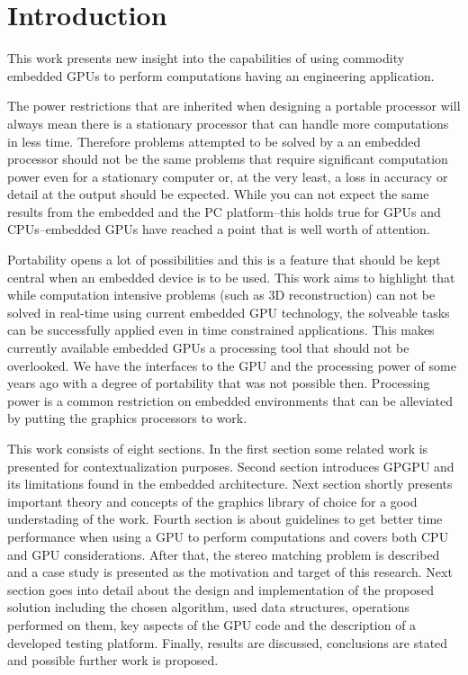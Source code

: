 \documentclass[conference]{IEEEtran}
\begin{document}
\section{Introduction}
This work presents new insight into the capabilities of using commodity embedded GPUs to perform computations having an engineering application.

The power restrictions that are inherited when designing a portable processor will always mean there is a stationary processor that can handle more computations in less time. Therefore problems attempted to be solved by a an embedded processor should not be the same problems that require significant computation power even for a stationary computer or, at the very least, a loss in accuracy or detail at the output should be expected. While you can not expect the same results from the embedded and the PC platform--this holds true for GPUs and CPUs--embedded GPUs have reached a point that is well worth of attention.

Portability opens a lot of possibilities and this is a feature that should be kept central when an embedded device is to be used. This work aims to highlight that while computation intensive problems (such as 3D reconstruction) can not be solved in real-time using current embedded GPU technology, the solveable tasks can be successfully applied even in time constrained applications. This makes currently available embedded GPUs a processing tool that should not be overlooked. We have the interfaces to the GPU and the processing power of some years ago with a degree of portability that was not possible then. Processing power is a common restriction on embedded environments that can be alleviated by putting the graphics processors to work.

This work consists of eight sections. In the first section some related work is presented for contextualization purposes. Second section introduces GPGPU and its limitations found in the embedded architecture. Next section shortly presents important theory and concepts of the graphics library of choice for a good understading of the work. Fourth section is about guidelines to get better time performance when using a GPU to perform computations and covers both CPU and GPU considerations. After that, the stereo matching problem is described and a case study is presented as the motivation and target of this research. Next section goes into detail about the design and implementation of the proposed solution including the chosen algorithm, used data structures, operations performed on them, key aspects of the GPU code and the description of a developed testing platform. Finally, results are discussed, conclusions are stated and possible further work is proposed.
\end{document}
